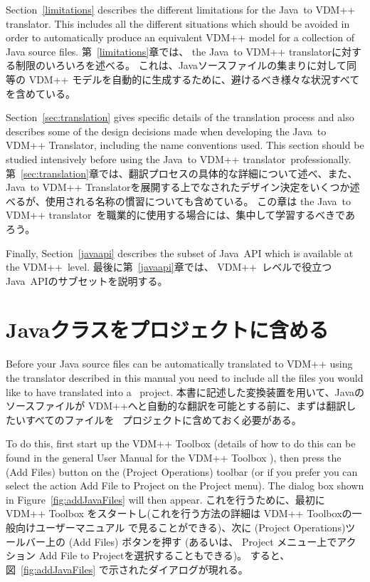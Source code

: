 \documentclass[\pformat,12pt]{jarticle}
\newcommand{\ToolboxName}{VDM++ Toolbox}
\newcommand{\JAVA}{Java}
\newcommand{\tjTov}{the \JAVA\ to VDM++ translator}
\newcommand{\VDM}{VDM++}
\newcommand{\jTov}{\JAVA\ to VDM++ Translator}
\newcommand{\guicmd}[1]{{\sf #1}}
\begin{document}
Section~\ref{limitations} describes the different limitations for \tjTov{}.
This includes all the different situations which should be
avoided in order to automatically produce an equivalent VDM++ model
for a collection of Java source files.
第~\ref{limitations}章では、 \tjTov{}に対する制限のいろいろを述べる。
これは、Javaソースファイルの集まりに対して同等の VDM++ モデルを自動的に生成するために、避けるべき様々な状況すべてを含めている。

Section~\ref{sec:translation}  gives specific details of the
translation process and also describes some of the design decisions
made when developing the \jTov{}, including the name conventions
used. This section should be studied intensively before using \tjTov\ 
professionally.
第~\ref{sec:translation}章では、翻訳プロセスの具体的な詳細について述べ、また、 \jTov{}を展開する上でなされたデザイン決定をいくつか述べるが、使用される名称の慣習についても含めている。
この章は \tjTov\ を職業的に使用する場合には、集中して学習するべきであろう。

Finally, Section~\ref{javaapi} describes the subset of \JAVA\ API
which is available at the \VDM\ level. 
最後に第~\ref{javaapi}章では、 \VDM\ レベルで役立つ \JAVA\ APIのサブセットを説明する。
\section{Javaクラスをプロジェクトに含める}

Before your Java source files can be automatically translated to VDM++
using the translator described in this manual you need to include all
the files you would like to have translated into a \VDMTools\
project. 
本書に記述した変換装置を用いて、Javaのソースファイルが VDM++へと自動的な翻訳を可能とする前に、まずは翻訳したいすべてのファイルを \VDMTools\ プロジェクトに含めておく必要がある。

To do this, first start up the \ToolboxName{} (details of how to do
this can be found in the general User Manual for the VDM++
Toolbox \cite{UserManPP-SCSK}), then press the 
(\guicmd{Add Files}) button on the (\guicmd{Project Operations})
toolbar (or if you prefer you can select the action \guicmd{Add File
  to Project} on the \guicmd{Project} menu). The dialog box shown
in Figure~\ref{fig:addJavaFiles} will then appear. 
これを行うために、最初に \ToolboxName{} をスタートし(これを行う方法の詳細は VDM++ Toolboxの一般向けユーザーマニュアル \cite{UserManPP-SCSK}で見ることができる)、次に (\guicmd{Project Operations})ツールバー上の  (\guicmd{Add Files}) ボタンを押す (あるいは、 \guicmd{Project} メニュー上でアクション \guicmd{Add File to Project}を選択することもできる)。 
すると、図~\ref{fig:addJavaFiles} で示されたダイアログが現れる。
\end{document}
